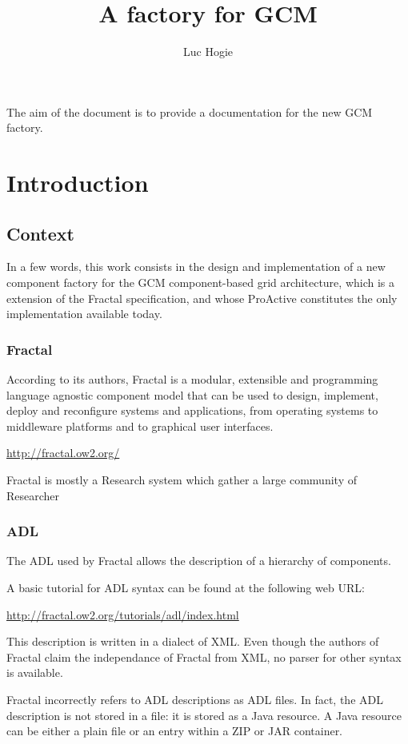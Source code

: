 \documentclass{article}
\title{A factory for GCM}
\author{Luc Hogie}
\newcommand{\urll}[1]{\begin{center}\url{#1}\end{center}}
\begin{document}
\maketitle

{\footnotesize
\tableofcontents
}
\newpage


The aim of the document is to provide a documentation for the new GCM factory.

\section{Introduction}

\subsection{Context}

In a few words, this work consists in the design and implementation of a new component factory for
the GCM component-based grid architecture, which is a extension of the Fractal specification, and whose
ProActive constitutes the only implementation available today.


\subsubsection{Fractal}

According to its authors, Fractal is a modular, extensible and programming language agnostic component model  that can be used to design, implement, deploy and reconfigure systems and applications, from operating systems to middleware platforms and to graphical user interfaces.
\urll{http://fractal.ow2.org/}
Fractal is mostly a Research system which gather a large community of Researcher


\subsubsection{ADL}

The ADL used by Fractal allows the description of a hierarchy of  components.

A basic tutorial for ADL syntax can be found at the following web URL:
\urll{http://fractal.ow2.org/tutorials/adl/index.html}

This description is written in a dialect of XML.
Even though the authors of Fractal claim
the independance of Fractal from XML, no parser for other syntax is available.

Fractal incorrectly refers to ADL descriptions as ADL files. In fact, the ADL description
is not stored in a file: it is stored as a Java resource. A Java resource can be either a plain file
or an entry within a ZIP or JAR container.
\end{document}
